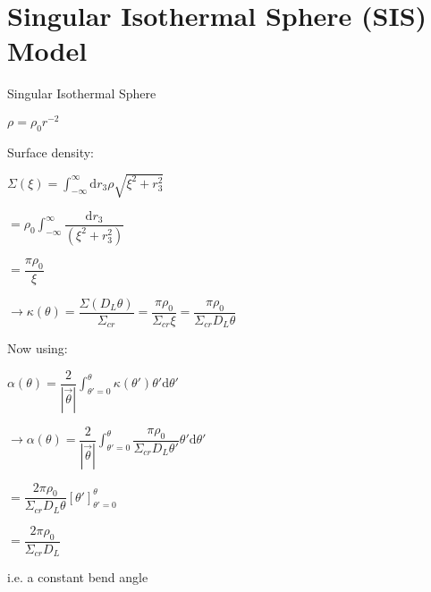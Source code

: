 \section{Singular Isothermal Sphere (SIS) Model}

Singular Isothermal Sphere

$\rho = \rho_0r^{-2}$

Surface density:

$\Sigma(\xi) =\displaystyle\int^\infty_{-\infty} \mathrm{d}r_3 \rho\sqrt{\xi^2+r_3^2}$

$=\rho_0 \displaystyle\int^\infty_{-\infty} \dfrac{\mathrm{d}r_3}{(\xi^2+r_3^2)}$

$=\dfrac{\pi\rho_0}{\xi}$

$\rightarrow \kappa(\theta) = \dfrac{\Sigma(D_L\theta)}{\Sigma_{cr}}=\dfrac{\pi\rho_0}{\Sigma_{cr}\xi}=\dfrac{\pi\rho_0}{\Sigma_{cr}D_L \theta}$

Now using:

$\alpha(\theta) =  \dfrac{2}{|\vec\theta|}\displaystyle\int^\theta_{\theta'=0} \kappa(\theta')\theta' \mathrm{d}\theta'$

$\rightarrow \alpha(\theta) = \dfrac{2}{|\vec\theta|}\displaystyle\int^\theta_{\theta'=0}  \dfrac{\pi\rho_0}{\Sigma_{cr}D_L \theta'}\theta' \mathrm{d}\theta'$

$=\dfrac{2\pi\rho_0}{\Sigma_{cr}D_L \theta} \left[\theta'\right]^\theta_{\theta'=0}$

$=\dfrac{2\pi\rho_0}{\Sigma_{cr}D_L}$

i.e. a constant bend angle

